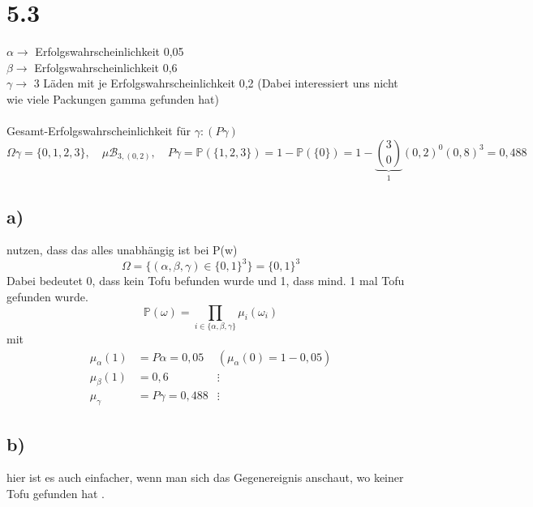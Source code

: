\documentclass{article} %
\begin{document}
\section{5.3}
$\alpha \rightarrow$ Erfolgswahrscheinlichkeit 0,05 \\
$\beta \rightarrow$ Erfolgswahrscheinlichkeit 0,6  \\
$\gamma \rightarrow$ 3 Läden mit je Erfolgswahrscheinlichkeit 0,2 (Dabei interessiert uns nicht wie viele Packungen gamma gefunden hat) \\ \\
Gesamt-Erfolgswahrscheinlichkeit für $\gamma: (P\gamma)$ 
\[
\Omega \gamma = \{0,1,2,3\}, \quad \mu \mathcal{B}_{3,(0,2)}, \quad P\gamma = \mathbb{P}(\{1,2,3\}) = 1 - \mathbb{P}(\{0\}) = 1 - \underbrace{\binom{3}{0}}_{1}(0,2)^0 (0,8)^3 = 0,488
\]

\subsection*{a)} nutzen, dass das alles unabhängig ist bei P(w)\\
\[
\Omega = \{(\alpha, \beta, \gamma) \in \{0,1\}^3\} = \{0,1\}^3
\]
Dabei bedeutet 0, dass kein Tofu befunden wurde und 1, dass mind. 1 mal Tofu gefunden wurde. 
\[
\mathbb{P}(\omega) = \prod_{i \in \{\alpha, \beta, \gamma\}} \mu_i (\omega_i) 
\]
mit 
\begin{align*}
    \mu_{\alpha}(1) & = P \alpha = 0,05 & (\mu_{\alpha}(0) = 1-0,05) \\
    \mu_{\beta}(1) & = 0,6 & \vdots \\
    \mu_{\gamma} & = P \gamma = 0,488 & \vdots
\end{align*}

\subsection{b)} hier ist es auch einfacher, wenn man sich das Gegenereignis anschaut, wo keiner Tofu gefunden hat . \\
\end{document}

